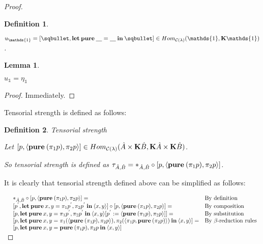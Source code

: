 \documentclass[a4paper]{article}
\newtheorem{lemma}{Lemma}
\newtheorem{defin}{Definition}
\begin{document}
\begin{proof}
\begin{defin}
  $ $

  $u_{\mathds{1}} = [\sqbullet, {\bf let \: pure \:} \underline{\quad} = \underline{\quad} {\: \bf in \:} \sqbullet] \in Hom_{\mathcal{C}(\lambda)}(\mathds{1}, {\bf K}\mathds{1})$.
\end{defin}

\begin{lemma}
  $ $

  $u_{\mathds{1}} = \eta_{\mathds{1}}$

\end{lemma}

\begin{proof}

  Immediately.
\end{proof}

  Tensorial strength is defined as follows:

\begin{defin} Tensorial strength
  $ $

  Let $[p, \langle {\bf pure \:} (\pi_1 p), \pi_2 p \rangle] \in Hom_{\mathcal{C}(\lambda)}(\hat{A} \times {\bf K}\hat{B}, {\bf K}\hat{A} \times {\bf K}\hat{B})$.

  So tensorial strength is defined as $\tau_{\hat{A}, \hat{B}} = \ast_{\hat{A}, \hat{B}} \circ [p, \langle {\bf pure \:} (\pi_1 p), \pi_2 p \rangle]$.
\end{defin}

It is clearly that tensorial strength defined above can be simplified as follows:

$\begin{array}{lll}
&\ast_{\hat{A}, \hat{B}} \circ [p, \langle {\bf pure \:} (\pi_1 p), \pi_2 p \rangle] = & \text{By definition} \\
&[p^{'}, {\bf let \: pure \:} x, y = \pi_1 p^{'}, \pi_2 p^{'} {\: \bf in \:} \langle x, y \rangle] \circ [p, \langle {\bf pure \:} (\pi_1 p), \pi_2 p \rangle] = & \text{By composition} \\
&[p, {\bf let \: pure \:} x, y = \pi_1 p^{'}, \pi_2 p^{'} {\: \bf in \:} \langle x, y \rangle [p^{'} := \langle {\bf pure \:} (\pi_1 p), \pi_2 p \rangle]] = & \text{By substitution} \\
&[p, {\bf let \: pure \:} x, y = \pi_1 (\langle {\bf pure \:} (\pi_1 p), \pi_2 p \rangle), \pi_2 (\langle \pi_1 p, {\bf pure \:} (\pi_2 p) \rangle) {\: \bf in \:} \langle x, y \rangle] = & \text{By $\beta$-reduction rules} \\
&[p, {\bf let \: pure \:} x, y = {\bf pure \:} (\pi_1 p), \pi_2 p {\: \bf in \:} \langle x, y \rangle]&
\end{array}$


\end{proof}
\end{document}
